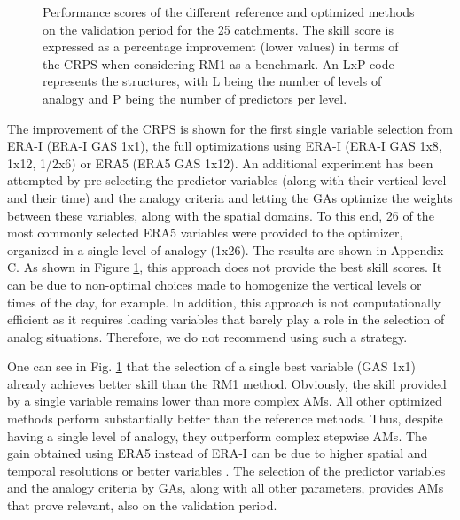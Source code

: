 \documentclass[draft]{agujournal2019}
\begin{document}
\begin{figure}[hbt]
	\noindent{}
	\caption{Performance scores of the different reference and optimized methods on the validation period for the 25 catchments. The skill score is expressed as a percentage improvement (lower values) in terms of the CRPS when considering RM1 as a benchmark. An LxP code represents the structures, with L being the number of levels of analogy and P being the number of predictors per level.}
	\label{fig_scores}
\end{figure}


The improvement of the CRPS is shown for the first single variable selection from ERA-I (ERA-I GAS 1x1), the full optimizations using ERA-I (ERA-I GAS 1x8, 1x12, 1/2x6) or ERA5 (ERA5 GAS 1x12). An additional experiment has been attempted by pre-selecting the predictor variables (along with their vertical level and their time) and the analogy criteria and letting the GAs optimize the weights between these variables, along with the spatial domains. To this end, 26 of the most commonly selected ERA5 variables were provided to the optimizer, organized in a single level of analogy (1x26). The results are shown in Appendix C. As shown in Figure \ref{fig_scores}, this approach does not provide the best skill scores. It can be due to non-optimal choices made to homogenize the vertical levels or times of the day, for example. In addition, this approach is not computationally efficient as it requires loading variables that barely play a role in the selection of analog situations. Therefore, we do not recommend using such a strategy.

One can see in Fig. \ref{fig_scores} that the selection of a single best variable (GAS 1x1) already achieves better skill than the RM1 method. Obviously, the skill provided by a single variable remains lower than more complex AMs. All other optimized methods perform substantially better than the reference methods. Thus, despite having a single level of analogy, they outperform complex stepwise AMs. The gain obtained using ERA5 instead of ERA-I can be due to higher spatial and temporal resolutions or better variables \cite{Horton2021}. The selection of the predictor variables and the analogy criteria by GAs, along with all other parameters, provides AMs that prove relevant, also on the validation period.
\end{document}
